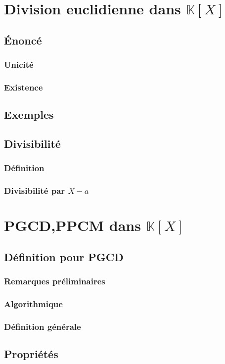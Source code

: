 \documentclass[12pt,a4paper,french]{book}
\begin{document}
	\section{Division euclidienne dans $\mathbb{K}[X]$}
		\subsection{Énoncé}
			\subsubsection{Unicité}
			\subsubsection{Existence}
		\subsection{Exemples}
		\subsection{Divisibilité}
			\subsubsection{Définition}
			\subsubsection{Divisibilité par $X-a$}
	\section{PGCD,PPCM dans $\mathbb{K}[X]$}
		\subsection{Définition pour PGCD}
			\subsubsection{Remarques préliminaires}
			\subsubsection{Algorithmique}
			\subsubsection{Définition générale}
		\subsection{Propriétés}
\end{document}
